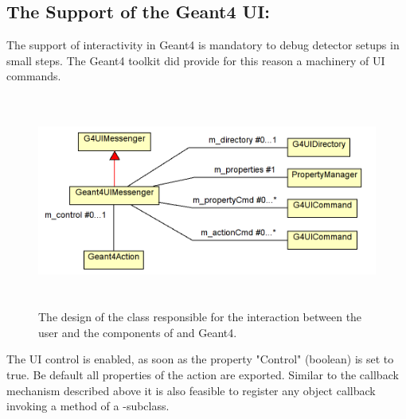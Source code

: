\documentclass[10pt,a4paper]{article}
\begin{document}
\newpage
\subsection{The Support of the Geant4 UI: }
\label{sec:ddg4-user-manual-geant4action-base}

\noindent
The support of interactivity in Geant4 is mandatory to debug detector
setups in small steps. The Geant4 toolkit did provide for this reason 
a machinery of UI commands.
\begin{figure}[h]
  \begin{center}
    \includegraphics[height=70mm] {DDG4-UIMessenger.png}
    \caption{The design of the  class responsible for
        the interaction between the user and the components of \DDG and Geant4.}
    \label{fig:ddg4-tracking-action}
  \end{center}
\end{figure}

\noindent
The UI control is enabled, as soon as the property "Control" (boolean) is set to true.
Be default all properties of the action are exported.
Similar to the callback mechanism described above it is also feasible to
register any object callback invoking a method of a -subclass. 
\end{document}
